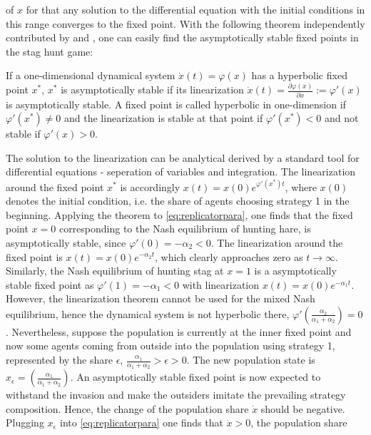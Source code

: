 of $x$ for that any solution to the differential equation with the initial 
conditions in this range converges to the fixed point. With the following 
theorem independently contributed by \textcite{hartman_lemma_1960} and 
\textcite{grobman_homeomorphism_1959}, one can easily 
find the asymptotically stable fixed points in the stag hunt game:
\begin{mydef}
        If a one-dimensional dynamical system $\dot{x}(t) = \varphi(x)$ 
        has a hyperbolic fixed point $x^*$, $x^*$ is asymptotically stable
        if its linearization 
        $\dot{x}(t) = \frac{\partial\varphi(x)}{\partial x} := \varphi'(x)$ 
        is asymptotically stable. 
        A fixed point is called hyperbolic in one-dimension if 
        $\varphi'(x^*) \neq 0$ and the linearization is stable at that
        point if $\varphi'(x^*) < 0$ and not stable if $\varphi'(x) >0$.
\end{mydef}
The solution to the linearization can be analytical derived by 
a standard tool for differential equations - seperation of variables and 
integration.
The linearization around the fixed point $x^*$ is accordingly
$x(t)= x(0) e^{\varphi'(x^*)t}$, where $x(0)$ denotes the 
initial condition, i.e. the share of agents choosing strategy 1 in the 
beginning.
Applying the theorem to \eqref{eq:replicatorpara}, one finds that the 
fixed point $x=0$ corresponding to the Nash equilibrium of hunting hare, is 
asymptotically stable, since $\varphi'(0) = - \alpha_2 <0$. 
The linearization around the fixed point is $x(t) = x(0) e^{-\alpha_2 t}$, 
which clearly approaches zero as $t \rightarrow \infty$. 
Similarly, the Nash equilibrium 
of hunting stag at $x=1$ is a asymptotically stable fixed point as
$\varphi'(1) = -\alpha_1 <0$ with linearization $x(t) = x(0) e^{-\alpha_1 t}$.
However, the linearization theorem cannot be used for the mixed Nash 
equilibrium, hence the dynamical system is not hyperbolic there, 
$\varphi'(\frac{\alpha_2}{\alpha_1+\alpha_2}) = 0$. Nevertheless, suppose 
the population is currently at the inner fixed point and now 
some agents coming from outside into the population
using strategy 1, represented by the share $\epsilon$,
$\frac{\alpha_1}{\alpha_1+\alpha_2}>\epsilon > 0$.
The new population state is 
$x_{\epsilon}=\left(\frac{\alpha_1}{\alpha_1+\alpha_2}\right)$.
An asymptotically stable fixed point is now expected to withstand the invasion
and make the outsiders imitate the prevailing strategy composition. Hence, 
the change of the population share $\dot{x}$ should be negative.
Plugging $x_{\epsilon}$ into
\eqref{eq:replicatorpara} one finds that $\dot{x} >0$, the population share
